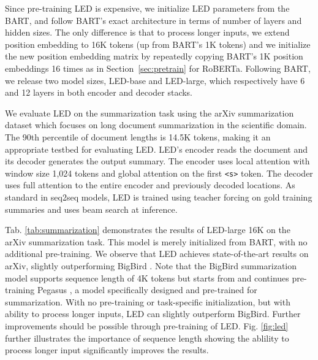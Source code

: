Since pre-training LED is expensive, we initialize LED parameters from the BART, and follow BART's exact architecture in terms of number of layers and hidden sizes. The only difference is that to process longer inputs, we extend position embedding to 16K tokens (up from BART's 1K tokens) and we initialize the new position embedding matrix by repeatedly copying BART's 1K position embeddings 16 times as in Section~\ref{sec:pretrain} for RoBERTa. Following BART, we release two model sizes, LED-base and LED-large, which respectively have 6 and 12 layers in both encoder and decoder stacks.

We evaluate LED on the summarization task using the arXiv summarization dataset \cite{arxiv2018} which focuses on long document summarization in the scientific domain. The 90th percentile of document lengths is 14.5K tokens, making it an appropriate testbed for evaluating LED. LED's encoder reads the document and its decoder generates the output summary. The encoder uses local attention with window size 1,024 tokens and global attention on the first \texttt{<s>} token. The decoder uses full attention to the entire encoder and previously decoded locations. As standard in seq2seq models, LED is trained using teacher forcing on gold training summaries and uses beam search at inference.

Tab. \ref{tab:summarization} demonstrates the results of LED-large 16K on the arXiv summarization task. This model is merely initialized from BART, with no additional pre-training. We observe that LED achieves state-of-the-art results on arXiv, slightly outperforming BigBird \cite{Zaheer2020BigBT}. Note that the BigBird summarization model supports sequence length of 4K tokens but starts from and continues pre-training Pegasus \cite{zhang2019pegasus}, a model specifically designed and pre-trained for summarization. With no pre-training or task-specific initialization, but with ability to process longer inputs, LED can slightly outperform BigBird. Further improvements should be possible through pre-training of LED. Fig. \ref{fig:led} further illustrates the importance of sequence length showing the ablility to process longer input significantly improves the results. 


